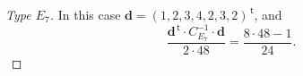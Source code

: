 \documentclass{article}
\theoremstyle{definition}
\renewcommand{\top}{\,\mathsf{t}}
\begin{document}
\begin{proof}[Type $E_7$]
In this case $\mathbf{d}=(1,2,3,4,2, 3,2)^{\top}$, and
\[ \frac{\mathbf{d}^{\top}\cdot C_{E_7}^{-1}\cdot \mathbf{d}}{2\cdot 48}=\frac{8\cdot 48-1}{24}. \]
\begin{comment}
	\[ 
	\frac{1}{2\cdot 48}
	\begin{pmatrix}
	1 \\ 2 \\ 3 \\ 4 \\2  \\ 3 \\ 2
	\end{pmatrix}^{\top}
	\cdot
	\begin{pmatrix}
	2 & -1 & 0 & 0 & 0 & 0 & 0 \\
	-1 & 2 & -1 & 0 & 0 & 0 & 0\\
	0 & -1 & 2 & -1 & 0 & 0 & 0 \\
	0 & 0 & -1 & 2 & -1 & -1 & 0 \\
	0 & 0 & 0 & -1 & 2 & 0 & 0 \\
	0 & 0 & 0 & -1 & 0 & 2 & -1 \\
	0 & 0 & 0 & 0  & 0 & -1 & 2
	\end{pmatrix}^{-1}
	\cdot
	\begin{pmatrix}
	1 \\ 2 \\ 3 \\ 4 \\2  \\ 3 \\ 2
	\end{pmatrix}
	=\frac{8\cdot 48-1}{24}.
	\]
\end{comment}
\end{proof}
\end{document}
